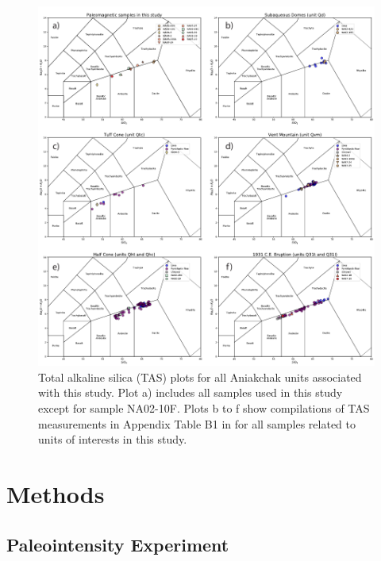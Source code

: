 \documentclass[draft]{agujournal2019}
\begin{document}
\begin{figure}
\centering
\noindent\includegraphics{../Figure/Geochem.pdf}
\caption{Total alkaline silica (TAS) plots for all Aniakchak units associated with this study. Plot a) includes all samples used in this study except for sample NA02-10F. Plots b to f show compilations of TAS measurements in Appendix Table B1 in  for all samples related to units of interests in this study. %
}
\label{TAS_plot}
\end{figure}

\section{Methods}
\subsection{Paleointensity Experiment}
\end{document}
